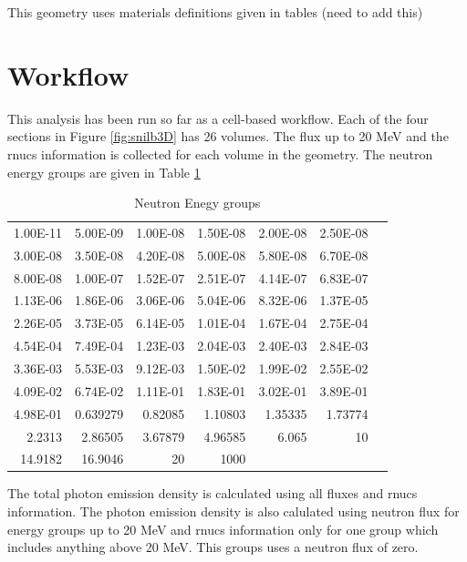 %
This geometry uses materials definitions given in tables (need to add this)

\section{Workflow}
This analysis has been run so far as a cell-based workflow. 
Each of the four sections in 
Figure \ref{fig:snilb3D} has 26 volumes. 
The flux up to 20 MeV and the rnucs information is collected for each 
volume in the geometry. 
The neutron energy groups are given in Table \ref{tab:En}
\begin{table}[h]
	\caption{Neutron Enegy groups}
	\centering
		\begin{tabular}{|r|r|r|r|r|r|r}
		\cline{1-6}
		1.00E-11 & 5.00E-09 & 1.00E-08 & 1.50E-08 & 2.00E-08              & 2.50E-08              &  \\ \cline{1-6}
		3.00E-08 & 3.50E-08 & 4.20E-08 & 5.00E-08 & 5.80E-08              & 6.70E-08              &  \\ \cline{1-6}
		8.00E-08 & 1.00E-07 & 1.52E-07 & 2.51E-07 & 4.14E-07              & 6.83E-07              &  \\ \cline{1-6}
		1.13E-06 & 1.86E-06 & 3.06E-06 & 5.04E-06 & 8.32E-06              & 1.37E-05              &  \\ \cline{1-6}
		2.26E-05 & 3.73E-05 & 6.14E-05 & 1.01E-04 & 1.67E-04              & 2.75E-04              &  \\ \cline{1-6}
		4.54E-04 & 7.49E-04 & 1.23E-03 & 2.04E-03 & 2.40E-03              & 2.84E-03              &  \\ \cline{1-6}
		3.36E-03 & 5.53E-03 & 9.12E-03 & 1.50E-02 & 1.99E-02              & 2.55E-02              &  \\ \cline{1-6}
		4.09E-02 & 6.74E-02 & 1.11E-01 & 1.83E-01 & 3.02E-01              & 3.89E-01              &  \\ \cline{1-6}
		4.98E-01 & 0.639279 & 0.82085  & 1.10803  & 1.35335               & 1.73774               &  \\ \cline{1-6}
		2.2313   & 2.86505  & 3.67879  & 4.96585  & 6.065                 & 10                    &  \\ \cline{1-6}
		14.9182  & 16.9046  & 20       & 1000      & \multicolumn{1}{l|}{} & \multicolumn{1}{l|}{} &  \\ \cline{1-6}
		\end{tabular}
		\label{tab:En}
\end{table}


The total photon emission density is calculated using all fluxes and rnucs information. 
The photon emission density is also calulated using neutron flux for energy groups up to 20 MeV 
and rnucs information only for one group which includes anything above 20 MeV. 
This groups uses a neutron flux of zero. 


